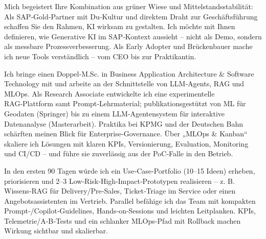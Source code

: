 Mich begeistert Ihre Kombination aus grüner Wiese und Mittelstandsstabilität: Als SAP‑Gold‑Partner mit Du‑Kultur und direktem Draht zur Geschäftsführung schaffen Sie den Rahmen, KI wirksam zu gestalten. Ich möchte mit Ihnen definieren, wie Generative KI im SAP‑Kontext aussieht – nicht als Demo, sondern als messbare Prozessverbesserung. Als Early Adopter und Brückenbauer mache ich neue Tools verständlich – vom CEO bis zur Praktikantin.

Ich bringe einen Doppel‑M.Sc. in Business Application Architecture & Software Technology mit und arbeite an der Schnittstelle von LLM‑Agents, RAG und MLOps. Als Research Associate entwickelte ich eine experimentelle RAG‑Plattform samt Prompt‑Lehrmaterial; publikationsgestützt von ML für Geodaten (Springer) bis zu einem LLM‑Agentensystem für interaktive Datenanalyse (Masterarbeit). Praktika bei KPMG und der Deutschen Bahn schärften meinen Blick für Enterprise‑Governance. Über „MLOps & Kanban“ skaliere ich Lösungen mit klaren KPIs, Versionierung, Evaluation, Monitoring und CI/CD – und führe sie zuverlässig aus der PoC‑Falle in den Betrieb.

In den ersten 90 Tagen würde ich ein Use‑Case‑Portfolio (10–15 Ideen) erheben, priorisieren und 2–3 Low‑Risk‑High‑Impact‑Prototypen realisieren – z. B. Wissens‑RAG für Delivery/Pre‑Sales, Ticket‑Triage im Service oder einen Angebotsassistenten im Vertrieb. Parallel befähige ich das Team mit kompakten Prompt‑/Copilot‑Guidelines, Hands‑on‑Sessions und leichten Leitplanken. KPIs, Telemetrie/A‑B‑Tests und ein schlanker MLOps‑Pfad mit Rollback machen Wirkung sichtbar und skalierbar.